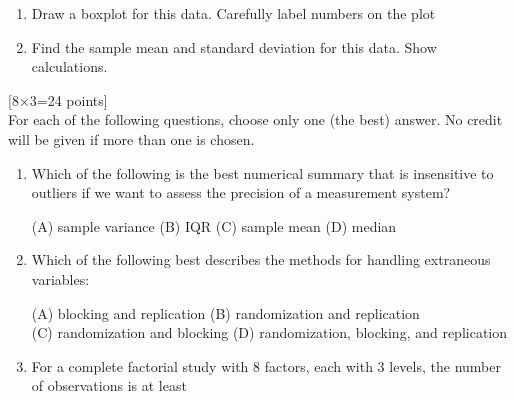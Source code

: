 \documentclass[11pt]{article}
\begin{document}
{\begin{enumerate}
\vskip 2cm
\newpage
\item[(c)] Draw a boxplot for this data. Carefully label numbers on
the plot

\vskip 12cm

\item[(d)] Find the sample mean and standard deviation for this
data. Show calculations.

\hfill {}

\hfill {}


\end{enumerate}


\newpage
{}\hfill[8$\times$3=24 points] \\For each of the
following questions, choose only one (the best) answer. No credit
will be given if more than one is chosen.

\begin{enumerate}
\item[(a)] Which of the following is the best numerical summary that is insensitive to outliers if we want to assess the precision of a measurement system? 

(A) sample variance \hspace{0.5cm} (B) IQR \hspace{0.5cm}(C) sample mean\hspace{0.5cm} (D) median

\vskip -0.7cm \hspace{6in}\fbox{
\textcolor[rgb]{1.00,1.00,1.00}{$\bigcap$}}

\item[(b)] Which of the following best describes the methods for handling
extraneous variables:

(A) blocking and replication \hspace{0.5cm}(B) randomization and
replication \\ (C) randomization and blocking \hspace{0.5cm}(D)
randomization, blocking, and replication

\vskip -0.7cm \hspace{6in}\fbox{
\textcolor[rgb]{1.00,1.00,1.00}{$\bigcap$}}


\item[(c)] For a complete factorial study with 8 factors, each with 3
levels, the number of observations is at least


\end{enumerate}}
\end{document}
